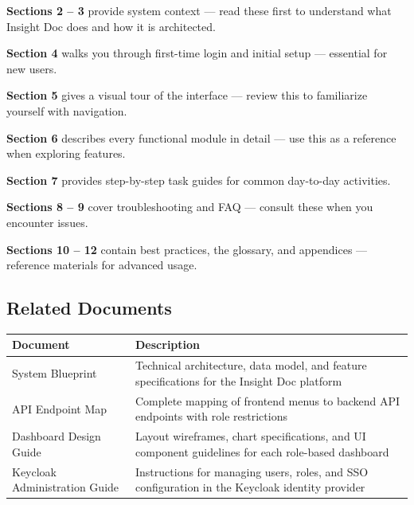 \begin{ugSteps}
  \item \textbf{Sections 2 -- 3} provide system context ---
    read these first to understand what Insight Doc does and
    how it is architected.
  \item \textbf{Section 4} walks you through first-time login
    and initial setup --- essential for new users.
  \item \textbf{Section 5} gives a visual tour of the interface
    --- review this to familiarize yourself with navigation.
  \item \textbf{Section 6} describes every functional module in
    detail --- use this as a reference when exploring features.
  \item \textbf{Section 7} provides step-by-step task guides
    for common day-to-day activities.
  \item \textbf{Sections 8 -- 9} cover troubleshooting and FAQ
    --- consult these when you encounter issues.
  \item \textbf{Sections 10 -- 12} contain best practices, the
    glossary, and appendices --- reference materials for
    advanced usage.
\end{ugSteps}

\subsection{Related Documents}

\begin{tabularx}{\textwidth}{@{} l X @{}}
  \toprule
  \textbf{Document} & \textbf{Description} \\
  \midrule
  System Blueprint
    & Technical architecture, data model, and feature
      specifications for the Insight Doc platform \\
  API Endpoint Map
    & Complete mapping of frontend menus to backend API
      endpoints with role restrictions \\
  Dashboard Design Guide
    & Layout wireframes, chart specifications, and UI
      component guidelines for each role-based dashboard \\
  Keycloak Administration Guide
    & Instructions for managing users, roles, and SSO
      configuration in the Keycloak identity provider \\
  \bottomrule
\end{tabularx}

